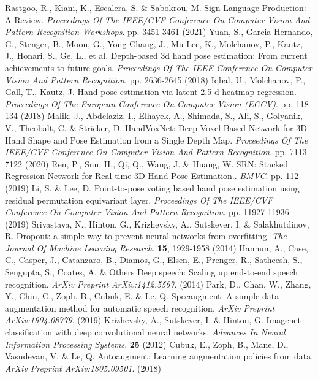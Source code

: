 \documentclass{article}
\begin{document}
\begin{thebibliography}{00}
Rastgoo, R., Kiani, K., Escalera, S. \& Sabokrou, M. Sign Language Production: A Review. {\em Proceedings Of The IEEE/CVF Conference On Computer Vision And Pattern Recognition Workshops}. pp. 3451-3461 (2021)
Yuan, S., Garcia-Hernando, G., Stenger, B., Moon, G., Yong Chang, J., Mu Lee, K., Molchanov, P., Kautz, J., Honari, S., Ge, L., et al. Depth-based 3d hand pose estimation: From current achievements to future goals. {\em Proceedings Of The IEEE Conference On Computer Vision And Pattern Recognition}. pp. 2636-2645 (2018)
Iqbal, U., Molchanov, P., Gall, T., Kautz, J. Hand pose estimation via latent 2.5 d heatmap regression. {\em Proceedings Of The European Conference On Computer Vision (ECCV)}. pp. 118-134 (2018)
Malik, J., Abdelaziz, I., Elhayek, A., Shimada, S., Ali, S., Golyanik, V., Theobalt, C. \& Stricker, D. HandVoxNet: Deep Voxel-Based Network for 3D Hand Shape and Pose Estimation from a Single Depth Map. {\em Proceedings Of The IEEE/CVF Conference On Computer Vision And Pattern Recognition}. pp. 7113-7122 (2020)
Ren, P., Sun, H., Qi, Q., Wang, J. \& Huang, W. SRN: Stacked Regression Network for Real-time 3D Hand Pose Estimation.. {\em BMVC}. pp. 112 (2019)
Li, S. \& Lee, D. Point-to-pose voting based hand pose estimation using residual permutation equivariant layer. {\em Proceedings Of The IEEE/CVF Conference On Computer Vision And Pattern Recognition}. pp. 11927-11936 (2019)
Srivastava, N., Hinton, G., Krizhevsky, A., Sutskever, I. \& Salakhutdinov, R. Dropout: a simple way to prevent neural networks from overfitting. {\em The Journal Of Machine Learning Research}. \textbf{15}, 1929-1958 (2014)
Hannun, A., Case, C., Casper, J., Catanzaro, B., Diamos, G., Elsen, E., Prenger, R., Satheesh, S., Sengupta, S., Coates, A. \& Others Deep speech: Scaling up end-to-end speech recognition. {\em ArXiv Preprint ArXiv:1412.5567}. (2014)
Park, D., Chan, W., Zhang, Y., Chiu, C., Zoph, B., Cubuk, E. \& Le, Q. Specaugment: A simple data augmentation method for automatic speech recognition. {\em ArXiv Preprint ArXiv:1904.08779}. (2019)
Krizhevsky, A., Sutskever, I. \& Hinton, G. Imagenet classification with deep convolutional neural networks. {\em Advances In Neural Information Processing Systems}. \textbf{25} (2012)
Cubuk, E., Zoph, B., Mane, D., Vasudevan, V. \& Le, Q. Autoaugment: Learning augmentation policies from data. {\em ArXiv Preprint ArXiv:1805.09501}. (2018)

\end{thebibliography}
\end{document}
